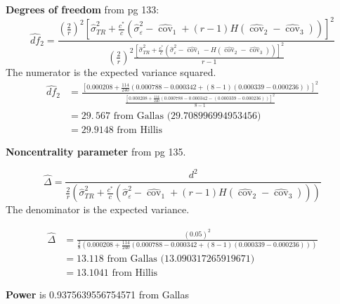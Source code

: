 \documentclass{article}%
\begin{document}
\textbf{Degrees of freedom} from \cite{Hillis2011_Acad-Radiol_v18p129} pg 133:%
\begin{equation}
\widehat{df}_{2}=\frac{\left(  \frac{2}{r}\right)  ^{2}\left[  \widehat{\sigma
}_{TR}^{2}+\frac{c^{\ast}}{c}\left(  \widehat{\sigma}_{\varepsilon}%
^{2}-\widehat{\operatorname{cov}}_{1}+\left(  r-1\right)  H\left(
\widehat{\operatorname{cov}}_{2}-\widehat{\operatorname{cov}}_{3}\right)
\right)  \right]  ^{2}}{\left(  \frac{2}{r}\right)  ^{2}\frac{\left[
\widehat{\sigma}_{TR}^{2}+\frac{c^{\ast}}{c}\left(  \widehat{\sigma
}_{\varepsilon}^{2}-\widehat{\operatorname{cov}}_{1}-H\left(
\widehat{\operatorname{cov}}_{2}-\widehat{\operatorname{cov}}_{3}\right)
\right)  \right]  ^{2}}{r-1}}%
\end{equation}
The numerator is the expected variance squared.%
\begin{align}
\widehat{df}_{2}  &  =\frac{\left[  0.000208+\frac{114}{240}\left(
0.000788-0.000342+\left(  8-1\right)  \left(  0.000339-0.000236\right)
\right)  \right]  ^{2}}{\frac{\left[  0.000208+\frac{114}{240}\left(
0.000788-0.000342-\left(  0.000339-0.000236\right)  \right)  \right]  ^{2}%
}{8-1}}\\
&  =29.\,\allowbreak567\text{ from Gallas (29.708996994953456)}\\
&  =29.9148\text{ from Hillis}%
\end{align}


\textbf{Noncentrality parameter} from \cite{Hillis2011_Acad-Radiol_v18p129} pg 135.%

\begin{equation}
\widehat{\Delta}=\frac{d^{2}}{\frac{2}{r}\left(  \widehat{\sigma}_{TR}%
^{2}+\frac{c^{\ast}}{c}\left(  \widehat{\sigma}_{\varepsilon}^{2}%
-\widehat{\operatorname{cov}}_{1}+\left(  r-1\right)  H\left(
\widehat{\operatorname{cov}}_{2}-\widehat{\operatorname{cov}}_{3}\right)
\right)  \right)  }%
\end{equation}
The denominator is the expected variance.%

\begin{align}
\widehat{\Delta}  &  =\frac{\left(  0.05\right)  ^{2}}{\frac{2}{8}\left(
0.000208+\frac{114}{240}\left(  0.000788-0.000342+\left(  8-1\right)  \left(
0.000339-0.000236\right)  \right)  \right)  }\\
&  =13.118\text{ from Gallas (13.090317265919671)}\\
&  =13.1041\text{ from Hillis}%
\end{align}


\textbf{Power} is 0.9375639556754571 from Gallas
\end{document}
